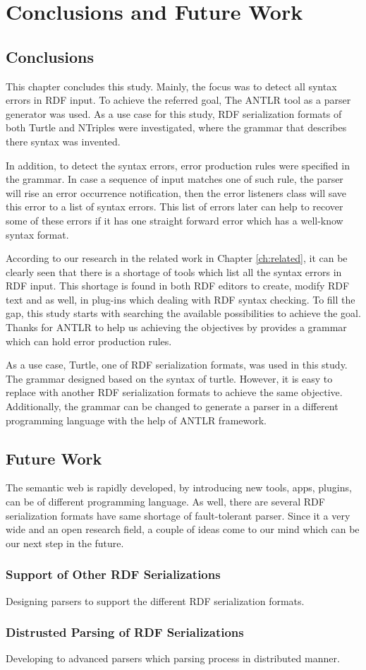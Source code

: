\chapter{Conclusions and Future Work}
\label{ch:conclusions}

\section{Conclusions}
This chapter concludes this study. Mainly, the focus was to detect all syntax errors in RDF input. To achieve the referred goal, The ANTLR tool as a parser generator was used. As a use case for this study, RDF serialization formats of both Turtle and NTriples were investigated, where the grammar that describes there syntax was invented.

In addition, to detect the syntax errors, error production rules were specified in the grammar. In case a sequence of input matches one of such rule, the parser will rise an error occurrence notification, then the error listeners class will save this error to a list of syntax errors. This list of errors later can help to recover some of these errors if it has one straight forward error which has a well-know syntax format. 

According to our research in the related work in Chapter \ref{ch:related}, it can be clearly seen that there is a shortage of tools which list all the syntax errors in RDF input. This shortage is found in both RDF editors to create, modify RDF text and as well, in plug-ins which dealing with RDF syntax checking. To fill the gap, this study starts with searching the available possibilities to achieve the goal. Thanks for ANTLR to help us achieving the objectives by provides a grammar which can hold error production rules. 

As a use case, Turtle, one of RDF serialization formats, was used in this study. The grammar designed based on the syntax of turtle. However, it is easy to replace with another RDF serialization formats to achieve the same objective. Additionally, the grammar can be changed to generate a parser in a different programming language with the help of ANTLR framework.   


\section{Future Work}
The semantic web is rapidly developed, by introducing new tools, apps, plugins, can be of different programming language. As well, there are several RDF serialization  formats have same shortage of fault-tolerant parser. 
Since it a very wide and an open research field, a couple of ideas come to our mind which can be our next step in the future. 
\subsection{Support of Other RDF Serializations}
     Designing parsers to support the different RDF serialization formats.

\subsection{Distrusted Parsing of RDF Serializations}
     Developing to advanced parsers which parsing process in distributed manner.


